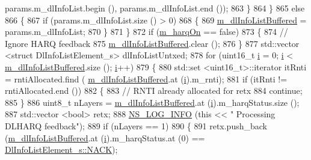\begin{DoxyCode}
       params.m\_dlInfoList.begin (), params.m\_dlInfoList.end ());
863         \}
864     \}
865   \textcolor{keywordflow}{else}
866     \{
867       \textcolor{keywordflow}{if} (params.m\_dlInfoList.size () > 0)
868         \{
869           \hyperlink{classns3_1_1TdTbfqFfMacScheduler_aabf2460c78d16c5202cdcda020ba06dd}{m\_dlInfoListBuffered} = params.m\_dlInfoList;
870         \}
871     \}
872   \textcolor{keywordflow}{if} (\hyperlink{classns3_1_1TdTbfqFfMacScheduler_afbd88f1e039b365dcdbb076e99ce5506}{m\_harqOn} == \textcolor{keyword}{false})
873     \{
874       \textcolor{comment}{// Ignore HARQ feedback}
875       \hyperlink{classns3_1_1TdTbfqFfMacScheduler_aabf2460c78d16c5202cdcda020ba06dd}{m\_dlInfoListBuffered}.clear ();
876     \}
877   std::vector <struct DlInfoListElement\_s> dlInfoListUntxed;
878   \textcolor{keywordflow}{for} (uint16\_t \hyperlink{bernuolliDistribution_8m_a6f6ccfcf58b31cb6412107d9d5281426}{i} = 0; \hyperlink{bernuolliDistribution_8m_a6f6ccfcf58b31cb6412107d9d5281426}{i} < \hyperlink{classns3_1_1TdTbfqFfMacScheduler_aabf2460c78d16c5202cdcda020ba06dd}{m\_dlInfoListBuffered}.size (); \hyperlink{bernuolliDistribution_8m_a6f6ccfcf58b31cb6412107d9d5281426}{i}++)
879     \{
880       std::set <uint16\_t>::iterator itRnti = rntiAllocated.find (
      \hyperlink{classns3_1_1TdTbfqFfMacScheduler_aabf2460c78d16c5202cdcda020ba06dd}{m\_dlInfoListBuffered}.at (\hyperlink{bernuolliDistribution_8m_a6f6ccfcf58b31cb6412107d9d5281426}{i}).m\_rnti);
881       \textcolor{keywordflow}{if} (itRnti != rntiAllocated.end ())
882         \{
883           \textcolor{comment}{// RNTI already allocated for retx}
884           \textcolor{keywordflow}{continue};
885         \}
886       uint8\_t nLayers = \hyperlink{classns3_1_1TdTbfqFfMacScheduler_aabf2460c78d16c5202cdcda020ba06dd}{m\_dlInfoListBuffered}.at (\hyperlink{bernuolliDistribution_8m_a6f6ccfcf58b31cb6412107d9d5281426}{i}).m\_harqStatus.size ();
887       std::vector <bool> retx;
888       \hyperlink{group__logging_gafbd73ee2cf9f26b319f49086d8e860fb}{NS\_LOG\_INFO} (\textcolor{keyword}{this} << \textcolor{stringliteral}{" Processing DLHARQ feedback"});
889       \textcolor{keywordflow}{if} (nLayers == 1)
890         \{
891           retx.push\_back (\hyperlink{classns3_1_1TdTbfqFfMacScheduler_aabf2460c78d16c5202cdcda020ba06dd}{m\_dlInfoListBuffered}.at (\hyperlink{bernuolliDistribution_8m_a6f6ccfcf58b31cb6412107d9d5281426}{i}).m\_harqStatus.at (0) == 
      \hyperlink{structns3_1_1DlInfoListElement__s_a3e55b89f756b7bd8909c8116a202a17aaf90e76e67c86729b4ee21927b7fb1770}{DlInfoListElement\_s::NACK});

\end{DoxyCode}
